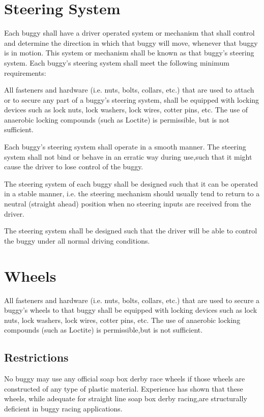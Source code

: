 \documentclass[openany]{book}
\begin{document}
\section{Steering System}

Each buggy shall have a driver operated system or mechanism that shall control and determine the direction in which that buggy will move, whenever that buggy is in motion. This system or mechanism shall be known as that buggy's steering system. Each buggy's steering system shall meet the following minimum requirements:

All fasteners and hardware (i.e. nuts, bolts, collars, etc.) that are used to attach or to secure any part of a buggy's steering system, shall be equipped with locking devices such as lock nuts, lock washers, lock wires, cotter pins, etc. The use of anaerobic locking compounds (such as Loctite) is permissible, but is not sufficient.

Each buggy's steering system shall operate in a smooth manner. The steering system shall not bind or behave in an erratic way during use,such that it might cause the driver to lose control of the buggy.

The steering system of each buggy shall be designed such that it can be operated in a stable manner, i.e. the steering mechanism should usually tend to return to a neutral (straight ahead) position when no steering inputs are received from the driver.

The steering system shall be designed such that the driver will be able to control the buggy under all normal driving conditions.

\section{Wheels}

All fasteners and hardware (i.e. nuts, bolts, collars, etc.) that are used to secure a buggy's wheels to that buggy shall be equipped with locking devices such as lock nuts, lock washers, lock wires, cotter pins, etc. The use of anaerobic locking compounds (such as Loctite) is permissible,but is not sufficient.

\subsection{Restrictions}

No buggy may use any official soap box derby race wheels if those wheels are constructed of any type of plastic material. Experience has shown that these wheels, while adequate for straight line soap box derby racing,are structurally deficient in buggy racing applications.
\end{document}
